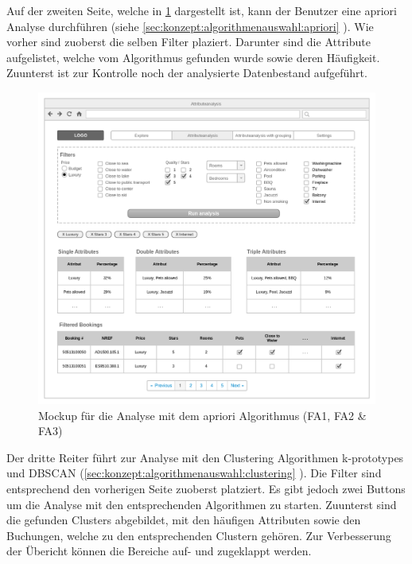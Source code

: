Auf der zweiten Seite, welche in \cref{fig:konzept:mockups:apriori} dargestellt ist, kann der Benutzer eine apriori Analyse durchführen (siehe \cref{sec:konzept:algorithmenauswahl:apriori} ). Wie vorher sind zuoberst die selben Filter plaziert. Darunter sind die Attribute aufgelistet, welche vom Algorithmus gefunden wurde sowie deren Häufigkeit. Zuunterst ist zur Kontrolle noch der analysierte Datenbestand aufgeführt.
\begin{figure}[H]
	\RawFloats
	\centering
	\includegraphics[width=1\textwidth]{images/wireframe-apriori}
	\caption{Mockup für die Analyse mit dem apriori Algorithmus (FA1, FA2 \& FA3)}
	\label{fig:konzept:mockups:apriori}
\end{figure}

Der dritte Reiter führt zur Analyse mit den Clustering Algorithmen k-prototypes und DBSCAN (\cref{sec:konzept:algorithmenauswahl:clustering} ). Die Filter sind entsprechend den vorherigen Seite zuoberst platziert. Es gibt jedoch zwei Buttons um die Analyse mit den entsprechenden Algorithmen zu starten. Zuunterst sind die gefunden Clusters abgebildet, mit den häufigen Attributen sowie den Buchungen, welche zu den entsprechenden Clustern gehören. Zur Verbesserung der Übericht können die Bereiche auf- und zugeklappt werden.

